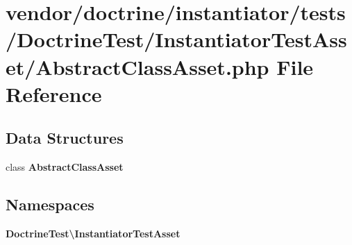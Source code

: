 \section{vendor/doctrine/instantiator/tests/\+Doctrine\+Test/\+Instantiator\+Test\+Asset/\+Abstract\+Class\+Asset.php File Reference}
\label{_abstract_class_asset_8php}
\subsection*{Data Structures}
\begin{DoxyCompactItemize}
\item 
class {\bf Abstract\+Class\+Asset}
\end{DoxyCompactItemize}
\subsection*{Namespaces}
\begin{DoxyCompactItemize}
\item 
 {\bf Doctrine\+Test\textbackslash{}\+Instantiator\+Test\+Asset}
\end{DoxyCompactItemize}
